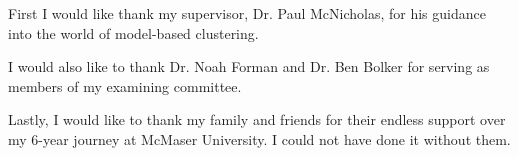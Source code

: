 
First I would like thank my supervisor, Dr. Paul McNicholas, for his guidance into the world of model-based clustering. 

I would also like to thank Dr. Noah Forman and Dr. Ben Bolker for serving as members of my examining committee.

Lastly, I would like to thank my family and friends for their endless support over my 6-year journey at McMaser University. I could not have done it without them.  

